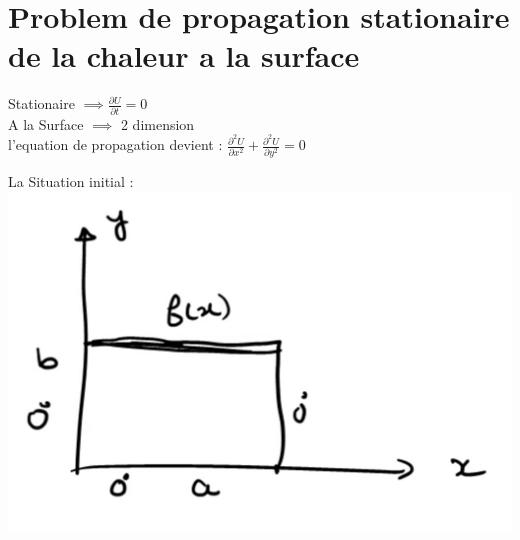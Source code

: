 \documentclass[12pt]{book}
\begin{document}
        \section{Problem de propagation stationaire de la chaleur a la surface}
            \begin{minipage}{0.49\linewidth}
                Stationaire $ \implies \frac{\partial U}{\partial t} =0 $  \\
                A la Surface $ \implies $ 2 dimension \\
                l'equation de propagation devient : $\frac{\partial^2U}{\partial x^2}+\frac{\partial^2 U}{\partial y^2} =0$ \\
            \end{minipage}
            \begin{minipage}{0.49\linewidth}
                La Situation initial : \\
                \includegraphics[width=1\linewidth]{pic/chaleursurface.png}
            \end{minipage}
\end{document}
